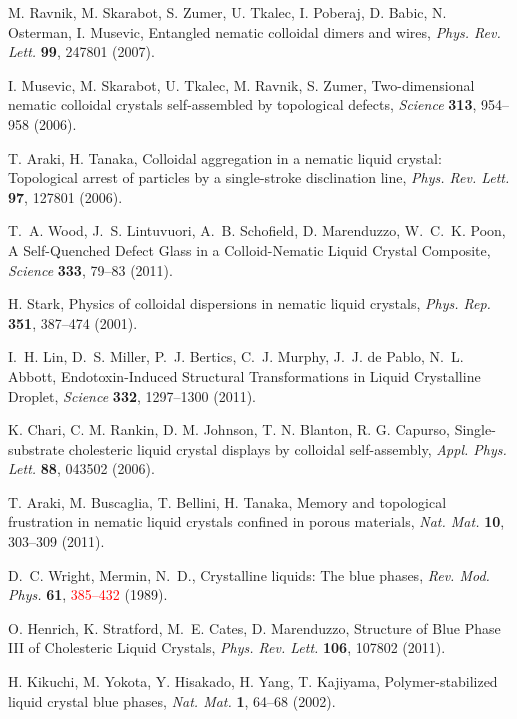 \documentclass[12pt]{article}
\begin{document}
\begin{thebibliography}{99}

 M. Ravnik, M. Skarabot, S. Zumer, U. Tkalec, I. Poberaj,
D. Babic, N. Osterman, I. Musevic,
Entangled nematic colloidal dimers and wires, 
{\it Phys. Rev. Lett.} {\bf 99}, 247801 (2007).

I. Musevic, M. Skarabot, U. Tkalec, M. Ravnik, S. Zumer,
Two-dimensional nematic colloidal crystals self-assembled by topological
defects,
{\it Science} {\bf 313}, 954--958 (2006).

 T. Araki, H. Tanaka,
Colloidal aggregation in a nematic liquid crystal: Topological arrest of
particles by a single-stroke disclination line,
{\it Phys. Rev. Lett.} {\bf 97}, 127801 (2006).

T.~A. Wood, J.~S. Lintuvuori, A.~B. Schofield, D. Marenduzzo, W.~C.~K. Poon,
A Self-Quenched Defect Glass in a Colloid-Nematic Liquid Crystal Composite,
{\it Science} {\bf 333}, 79--83 (2011).

 H. Stark,
Physics of colloidal dispersions in nematic liquid crystals,
{\it Phys. Rep.} {\bf 351}, 387--474 (2001).

I.~H. Lin, D.~S. Miller, P.~J. Bertics, C.~J. Murphy, J.~J. de Pablo,
N.~L. Abbott,
Endotoxin-Induced Structural Transformations in Liquid Crystalline Droplet,
{\it Science} {\bf 332}, 1297--1300 (2011).

K. Chari, C. M. Rankin, D. M. Johnson, T. N. Blanton, R. G. Capurso,
Single-substrate cholesteric liquid crystal displays by colloidal
self-assembly,
{\it Appl. Phys. Lett.} {\bf 88}, 043502 (2006).

 T. Araki, M. Buscaglia, T. Bellini, H. Tanaka,
Memory and topological frustration in nematic liquid crystals confined
in porous materials, {\it Nat. Mat.} {\bf 10}, 303--309 (2011).

 D.~C. Wright, Mermin, N.~D.,
Crystalline liquids: The blue phases, {\it Rev. Mod. Phys.} {\bf 61},
\textcolor{red}{385--432} (1989).

 O. Henrich, K. Stratford, M.~E. Cates, D. Marenduzzo,
 Structure of Blue Phase III of Cholesteric Liquid Crystals,
{\it Phys. Rev. Lett.} {\bf 106}, 107802 (2011).

H. Kikuchi, M. Yokota, Y. Hisakado, H. Yang, T. Kajiyama,
Polymer-stabilized liquid crystal blue phases,
{\it Nat. Mat.} {\bf 1}, 64--68 (2002).


\end{thebibliography}
\end{document}

